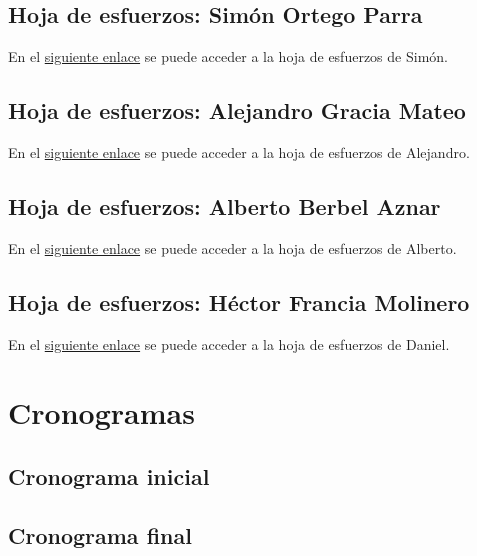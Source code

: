 \documentclass[10pt,spanish]{article}
\let\stdsection\section
\renewcommand\section{\newpage\stdsection}
\newcommand{\hojaesfuerzos}[2]{\href{run:xls/#1.xls}{#2}}
\begin{document}
\subsection{Hoja de esfuerzos: Simón Ortego Parra}
%
En el \hojaesfuerzos{b_3_hoja_de_esfuerzos_simon}{siguiente enlace} se puede acceder a la hoja de 
esfuerzos de Simón.

\subsection{Hoja de esfuerzos: Alejandro Gracia Mateo}
%
En el \hojaesfuerzos{b_4_hoja_de_esfuerzos_alejandro}{siguiente enlace} se puede acceder a la hoja de 
esfuerzos de Alejandro.

\subsection{Hoja de esfuerzos: Alberto Berbel Aznar}
%
En el \hojaesfuerzos{b_5_hoja_de_esfuerzos_alberto}{siguiente enlace} se puede acceder a la hoja de 
esfuerzos de Alberto.

\subsection{Hoja de esfuerzos: Héctor Francia Molinero}
%
En el \hojaesfuerzos{b_6_hoja_de_esfuerzos_hector}{siguiente enlace} se puede acceder a la hoja de 
esfuerzos de Daniel.


\section{Cronogramas}


\subsection{Cronograma inicial}


\subsection{Cronograma final}

\end{document}
